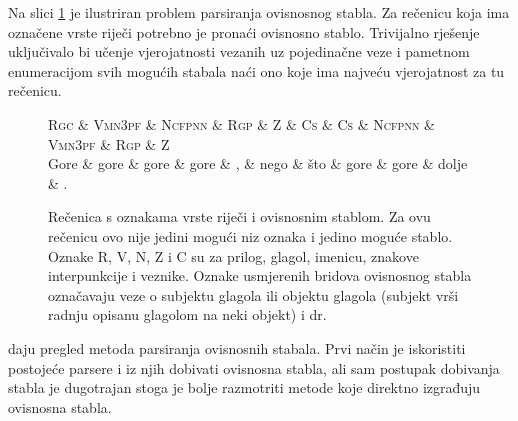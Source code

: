 Na slici \ref{fig:depparsing} je ilustriran problem parsiranja ovisnosnog
stabla. Za rečenicu koja ima označene vrste riječi potrebno je pronaći ovisnosno
stablo. Trivijalno rješenje uključivalo bi učenje vjerojatnosti vezanih uz
pojedinačne veze i pametnom enumeracijom svih mogućih stabala naći ono koje ima
najveću vjerojatnost za tu rečenicu.

\begin{figure}
\centering
\begin{dependency}[theme = simple]
\begin{deptext}
  \textsc{Rgc} \& \textsc{Vmn3pf} \& \textsc{Ncfpnn} \& \textsc{Rgp} \& \textsc{Z} \& \textsc{Cs} \& \textsc{Cs} \& \textsc{Ncfpnn} \& \textsc{Vmn3pf} \& \textsc{Rgp} \& \textsc{Z} \\
  Gore         \& gore            \& gore            \& gore         \& ,          \& nego        \& što         \& gore            \& gore            \& dolje        \& .          \\
\end{deptext}
\end{dependency}
\caption[Rečenica s oznakama vrste riječi i ovisnosnim stablom.]{Rečenica s
oznakama vrste riječi i ovisnosnim stablom. Za ovu rečenicu ovo nije jedini
mogući niz oznaka i jedino moguće stablo. Oznake R, V, N, Z i C su za prilog,
glagol, imenicu, znakove interpunkcije i veznike. Oznake usmjerenih bridova
ovisnosnog stabla označavaju veze o subjektu glagola ili objektu glagola
(subjekt vrši radnju opisanu glagolom na neki objekt) i dr.}
\label{fig:depparsing}
\end{figure}

\citet{cer2010parsing} daju pregled metoda parsiranja ovisnosnih stabala. Prvi
način je iskoristiti postojeće  parsere i iz njih dobivati
ovisnosna stabla, ali sam postupak dobivanja  stabla je
dugotrajan stoga je bolje razmotriti metode koje direktno izgrađuju ovisnosna
stabla.


